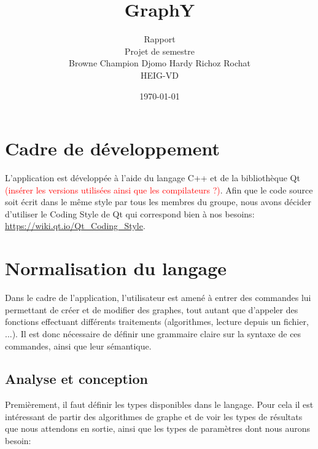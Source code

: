 \documentclass[french]{article}
\begin{document}
	\title{GraphY} %
	\author{Rapport\\ 
		Projet de semestre\\
		Browne Champion Djomo Hardy Richoz Rochat\\
		HEIG-VD}
	\date{\today} %
	\maketitle
	
	\tableofcontents
	
	\justify
	\normalsize
	
	\section{Cadre de développement} %
		L'application est développée à l'aide du langage C++ et de la bibliothèque Qt \textcolor{red}{(insérer les versions utilisées ainsi que les compilateurs ?)}. Afin que le code source soit écrit dans le même style par tous les membres du groupe, nous avons décider d'utiliser le Coding Style de Qt qui correspond bien à nos besoins: \url{https://wiki.qt.io/Qt_Coding_Style}.
	
	\section{Normalisation du langage} %
		Dans le cadre de l'application, l'utilisateur est amené à entrer des commandes lui permettant de créer et de modifier des graphes, tout autant que d'appeler des fonctions effectuant différents traitements (algorithmes, lecture depuis un fichier, ...). Il est donc nécessaire de définir une grammaire claire sur la syntaxe de ces commandes, ainsi que leur sémantique.
			
		\subsection{Analyse et conception} %
			Premièrement, il faut définir les types disponibles dans le langage. Pour cela il est intéressant de partir des algorithmes de graphe et de voir les types de résultats que nous attendons en sortie, ainsi que les types de paramètres dont nous aurons besoin:
				
\end{document}
